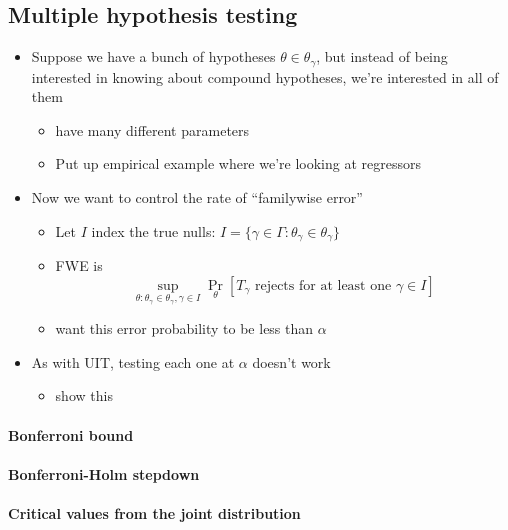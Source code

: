 \subsection{Multiple hypothesis testing}

\begin{itemize}
\item Suppose we have a bunch of hypotheses $θ ∈ θ_γ$, but instead of
  being interested in knowing about compound hypotheses, we're
  interested in all of them
  \begin{itemize}
  \item have many different parameters
  \item Put up empirical example where we're looking at regressors
  \end{itemize}
\item Now we want to control the rate of ``familywise error''
  \begin{itemize}
  \item Let $I$ index the true nulls: $I = \{γ ∈ Γ : θ_γ ∈ θ_γ\}$
  \item FWE is \[\sup_{θ: θ_γ ∈ θ_γ, γ ∈ I} \Pr_θ[T_γ \text{ rejects
      for at least one } γ ∈ I]\]
  \item want this error probability to be less than $α$
  \end{itemize}
\item As with UIT, testing each one at $α$ doesn't work
  \begin{itemize}
  \item show this
  \end{itemize}
\end{itemize}

\paragraph{Bonferroni bound}

\paragraph{Bonferroni-Holm stepdown}

\paragraph{Critical values from the joint distribution}


